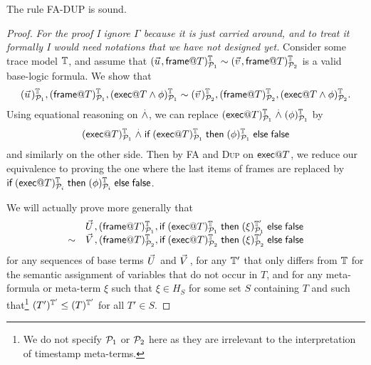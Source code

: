 \begin{proposition}
  The rule \textsc{FA-DUP} is sound.
\end{proposition}
\begin{proof}
  \emph{For the proof I ignore $\Gamma$ because it is just carried around,
  and to treat it formally I would need notations that we have not designed
  yet.}
  Consider some trace model $\mathbb{T}$,
  and assume that
  $(\pvec u,\mframe @ T)^\TM_{\calp_1} \sim
   (\pvec v,\mframe @ T)^\TM_{\calp_2}$
  is a valid base-logic formula.
  We show that
  $$
  \interp{\pvec u}{\TM}{\calp_1},
  \interp{\mframe @ T}{\TM}{\calp_1},
  (\mexec @ T \wedge \phi)^\TM_{\calp_1}
  \sim
  \interp{\pvec v}{\TM}{\calp_2},
  \interp{\mframe @ T}{\TM}{\calp_2},
  (\mexec @ T \wedge \phi)^\TM_{\calp_2}.
  $$
  Using equational reasoning on $\stackrel{.}{\wedge}$, we can replace
  $(\textsf{exec} @ T)^{\mathbb{T}}_{\mathcal{P}_1} \stackrel{.}{\wedge} (\phi)^{\mathbb{T}}_{\mathcal{P}_1}$ by
  $$(\textsf{exec} @ T)^{\mathbb{T}}_{\mathcal{P}_1} \stackrel{.}{\wedge}
  \textsf{if}\; (\textsf{exec} @ T)^{\mathbb{T}}_{\mathcal{P}_1}
  \;\textsf{then}\; (\phi)^{\mathbb{T}}_{\mathcal{P}_1} \;\textsf{else}\; \textsf{false}$$
  and similarly on the other side.
  Then by \textsc{FA} and \textsc{Dup} on $\textsf{exec} @ T$,
  we reduce our equivalence to proving the one where the last items
  of frames are replaced by
  $
  \textsf{if}\; (\textsf{exec} @ T)^{\mathbb{T}}_{\mathcal{P}_i}
  \;\textsf{then}\; (\phi)^{\mathbb{T}}_{\mathcal{P}_i} \;\textsf{else}\; \textsf{false}
  $.

  We will actually prove more generally that
  $$
  \begin{array}{rl}
    &
    \pvec U,
    \interp{\mframe @ T}{\TM}{\calp_1},
    \myif \interp{\mexec @ T}{\TM}{\calp_1}
    \mythen \interp{\xi}{\TM'}{\calp_1} \myelse \false
    \\ \sim &
    \pvec V,
    \interp{\mframe @ T}{\TM}{\calp_2},
    \myif \interp{\mexec @ T}{\TM}{\calp_2}
    \mythen \interp{\xi}{\TM'}{\calp_2} \myelse \false
  \end{array}
  $$
  for any sequences of base terms $\pvec U$ and $\pvec V$,
  for any $\mathbb{T}'$ that only differs from $\mathbb{T}$ for the semantic
  assignment of variables that do not occur in $T$,
  and for any meta-formula or meta-term $\xi$ such that $\xi \in H_S$
  for some set $S$ containing $T$ and such that\footnote{
    We do not specify $\mathcal{P}_1$ or $\mathcal{P}_2$ here
    as they are irrelevant to the interpretation of timestamp meta-terms.
  } $(T')^{\mathbb{T}'}_{}\leq(T)^{\mathbb{T}'}_{}$ for all $T'\in S$.


\end{proof}
